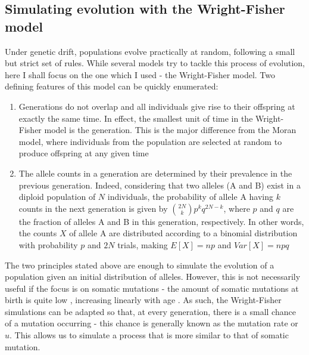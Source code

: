 \subsection{Simulating evolution with the Wright-Fisher model}

Under genetic drift, populations evolve practically at random, following a small but strict set of rules. While several models try to tackle this process of evolution, here I shall focus on the one which I used - the Wright-Fisher model. Two defining features of this model can be quickly enumerated:
\begin{enumerate}
    \item Generations do not overlap and all individuals give rise to their offspring at exactly the same time. In effect, the smallest unit of time in the Wright-Fisher model is the generation. This is the major difference from the Moran model, where individuals from the population are selected at random to produce offspring at any given time
    \item The allele counts in a generation are determined by their prevalence in the previous generation. Indeed, considering that two alleles (A and B) exist in a diploid population of $N$ individuals, the probability of allele A having $k$ counts in the next generation is given by $\binom{2N}{k}p^kq^{2N-k}$, where $p$ and $q$ are the fraction of alleles A and B in this generation, respectively. In other words, the counts $X$ of allele A are distributed according to a binomial distribution with probability $p$ and $2N$ trials, making $E[X] = np$ and $Var[X] = npq$
\end{enumerate}
The two principles stated above are enough to simulate the evolution of a population given an initial distribution of alleles. However, this is not necessarily useful if the focus is on somatic mutations - the amount of somatic mutations at birth is quite low \cite{SpencerChapman_2021_gjz4x4}, increasing linearly with age \cite{Abascal_2021_gjvqfm}. As such, the Wright-Fisher simulations can be adapted so that, at every generation, there is a small chance of a mutation occurring - this chance is generally known as the mutation rate or $u$. This allows us to simulate a process that is more similar to that of somatic mutation.

